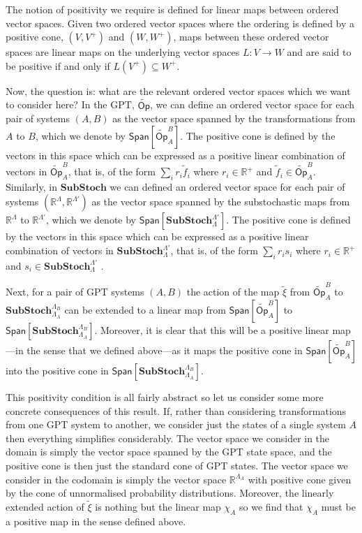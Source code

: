 \documentclass[10pt,twocolumn,aps,groupedaddress,nofootinbib]{revtex4}
\newcommand\Op{\mathsf{Op}}
\begin{document}
 The notion of positivity we require is defined for linear maps between ordered vector spaces. Given two ordered vector spaces where the ordering is defined by a positive cone, $(V,V^+)$ and $(W,W^+)$, maps between these ordered vector spaces are  linear maps on the underlying vector spaces $L:V\to W$ and are said to be positive if and only if $L(V^+)\subseteq W^+$.

Now, the question is: what are the relevant ordered vector spaces which we want to consider here? In the GPT, $\widetilde{\Op}$, we can define an ordered vector space for each pair of systems $(A,B)$ as the vector space spanned by the transformations from $A$ to $B$, which we denote by $\mathsf{Span}[\widetilde{\Op}_A^B]$. The positive cone is defined by the vectors in this space which can be expressed as a positive linear combination of vectors in $\widetilde{\Op}_A^B$, that is, of the form $\sum_i r_i \widetilde{f}_i$ where $r_i \in \mathds{R}^+$ and $\widetilde{f}_i \in \widetilde{\Op}_A^B$. Similarly, in $\mathbf{SubStoch}$ we can defined an ordered vector space for each pair of systems $(\mathds{R}^\Lambda, \mathds{R}^{\Lambda'})$ as the vector space spanned by the substochastic maps from $\mathds{R}^\Lambda$ to $\mathds{R}^{\Lambda'}$, which we denote by $\mathsf{Span}[\mathbf{SubStoch}_\Lambda^{\Lambda'}]$. The positive cone is defined by the vectors in this space which can be expressed as a positive linear combination of vectors in $\mathbf{SubStoch}_\Lambda^{\Lambda'}$, that is, of the form $\sum_i r_i s_i$ where $r_i \in \mathds{R}^+$ and $s_i \in \mathbf{SubStoch}_\Lambda^{\Lambda'}$ .

Next, for a pair of GPT systems $(A,B)$ the action of the map $\widetilde{\xi}$ from $\widetilde{\Op}_A^B$ to $\mathbf{SubStoch}_{\Lambda_A}^{\Lambda_B}$ can be extended to a linear map from $\mathsf{Span}[\widetilde{\Op}_A^B]$ to $\mathsf{Span}[\mathbf{SubStoch}_{\Lambda_A}^{\Lambda_B}]$. Moreover, it is clear that this will be a positive linear map---in the sense that we defined above---as it maps the positive cone in $\mathsf{Span}[\widetilde{\Op}_A^B]$  into the positive cone in $\mathsf{Span}[\mathbf{SubStoch}_{\Lambda_A}^{\Lambda_B}]$.

This positivity condition is all fairly abstract so let us consider some more concrete consequences of this result. If, rather than considering transformations from one GPT system to another, we consider just the states of a single system $A$ then everything simplifies considerably. The vector space we consider in the domain is simply the vector space spanned by the GPT state space, and the positive cone is then just the standard cone of GPT states. The vector space we consider in the codomain is simply the vector space $\mathds{R}^{\Lambda_A}$ with positive cone given by the cone of unnormalised probability distributions. Moreover, the linearly extended action of $\widetilde{\xi}$ is nothing but the linear map $\chi_A$ so we find that $\chi_A$ must be a positive map in the sense defined above.
\end{document}

